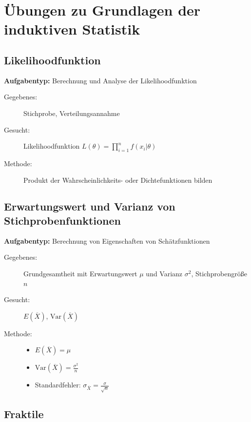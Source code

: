 \documentclass[12pt, a4paper, titlepage, ngerman]{scrartcl}
\begin{document}
\section{Übungen zu Grundlagen der induktiven Statistik}

\subsection{Likelihoodfunktion}

\textbf{Aufgabentyp:} Berechnung und Analyse der Likelihoodfunktion

\begin{description}
  \item[Gegebenes:] Stichprobe, Verteilungsannahme
  \item[Gesucht:] Likelihoodfunktion $L(\theta) = \prod_{i=1}^n f(x_i | \theta)$
  \item[Methode:] Produkt der Wahrscheinlichkeits- oder Dichtefunktionen bilden
\end{description}

\subsection{Erwartungswert und Varianz von Stichprobenfunktionen}

\textbf{Aufgabentyp:} Berechnung von Eigenschaften von Schätzfunktionen

\begin{description}
  \item[Gegebenes:] Grundgesamtheit mit Erwartungswert $\mu$ und Varianz $\sigma^2$, Stichprobengröße $n$
  \item[Gesucht:] $E(\overline{X})$, $\text{Var}(\overline{X})$
  \item[Methode:] 
    \begin{itemize}
      \item $E(\overline{X}) = \mu$
      \item $\text{Var}(\overline{X}) = \frac{\sigma^2}{n}$
      \item Standardfehler: $\sigma_{\overline{X}} = \frac{\sigma}{\sqrt{n}}$
    \end{itemize}
\end{description}

\subsection{Fraktile}
\end{document}
